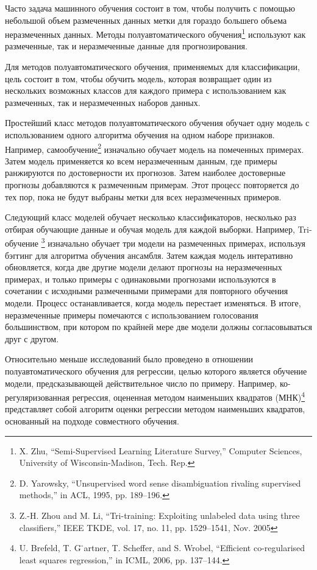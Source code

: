 \documentclass[12pt,a4paper, oneside]{extreport}
\begin{document}
Часто  задача машинного  обучения состоит в том, чтобы получить с помощью   небольшой объем размеченных данных метки для  гораздо большего  объема неразмеченных данных. 
Методы полуавтоматического обучения\footnote{X. Zhu, “Semi-Supervised Learning Literature Survey,” Computer Sciences, University of Wisconsin-Madison, Tech. Rep.} 
используют как размеченные, так и неразмеченные данные для прогнозирования. 


Для методов полуавтоматического обучения,  применяемых   для классификации,  цель состоит в том, чтобы обучить модель, которая возвращает один из нескольких возможных классов для каждого примера с использованием как размеченных, так и неразмеченных наборов данных.

Простейший класс методов полуавтоматического обучения обучает одну модель с использованием одного алгоритма обучения на одном наборе признаков. Например, самообучение\footnote{D. Yarowsky, “Unsupervised word sense disambiguation rivaling 	supervised methods,” in ACL, 1995, pp. 189–196.} изначально обучает модель на помеченных примерах. Затем модель применяется ко всем неразмеченным данным, где примеры ранжируются по достоверности их прогнозов. Затем наиболее достоверные прогнозы добавляются к размеченным примерам.
Этот процесс повторяется до тех пор, пока не будут выбраны метки для всех   неразмеченных примеров. 

Следующий класс моделей  обучает несколько классификаторов, несколько раз отбирая обучающие данные и обучая модель для каждой выборки. Например, Tri-обучение \footnote{Z.-H. Zhou and M. Li, “Tri-training: Exploiting unlabeled data 	using three classifiers,” IEEE TKDE, vol. 17, no. 11, pp. 1529–1541, Nov. 2005} изначально обучает три модели на размеченных примерах, используя бэггинг для алгоритма обучения ансамбля. Затем каждая модель интеративно обновляется, когда две другие модели делают прогнозы на неразмеченных примерах, и только примеры с одинаковыми прогнозами используются в сочетании с исходными размеченными примерами для повторного обучения модели.
Процесс останавливается, когда модель перестает изменяться. В итоге, неразмеченные примеры помечаются с использованием голосования большинством, при котором по крайней мере две модели должны согласовываться друг с другом.


Относительно меньше исследований было проведено в отношении полуавтоматического обучения для регрессии, целью которого является обучение модели, предсказывающей действительное число по примеру. Например, ко-регуляризованная регрессия, оцененная   методом наименьших квадратов  (МНК)\footnote{U. Brefeld, T. G ̈artner, T. Scheffer, and S. Wrobel, “Efficient co-regularised least squares regression,” in ICML, 2006, pp. 137–144.} представляет собой алгоритм оценки регрессии методом наименьших квадратов, основанный на подходе совместного обучения. 
\end{document}
